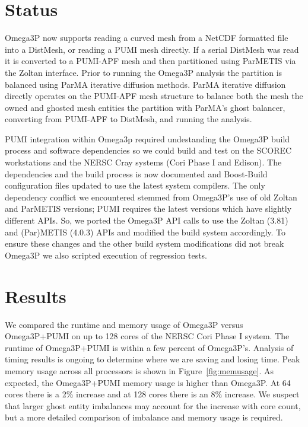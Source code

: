 \documentclass[a4paper]{article}
\begin{document}
\section{Status}
Omega3P now supports reading a curved mesh from a NetCDF formatted file into a
DistMesh, or reading a PUMI mesh directly.
If a serial DistMesh was read it is converted to a PUMI-APF mesh and then 
partitioned using ParMETIS via the Zoltan interface.
Prior to running the Omega3P analysis the partition is balanced using ParMA
iterative diffusion methods.
ParMA iterative diffusion directly operates on the PUMI-APF mesh structure to
balance both the mesh 
the owned and ghosted mesh entities 
the partition with ParMA's ghost balancer, converting from PUMI-APF to DistMesh,
and running the analysis.

PUMI integration within Omega3p required undestanding the Omega3P build process
and software dependencies so we could build and test on the SCOREC workstations
and the NERSC Cray systems (Cori Phase I and Edison).
The dependencies and the build process is now documented and Boost-Build
configuration files updated to use the latest system compilers.
The only dependency conflict we encountered stemmed from Omega3P's use of old
Zoltan and ParMETIS versions; PUMI requires the latest versions which have
slightly different APIs.
So, we ported the Omega3P API calls to use the Zoltan (3.81) and
(Par)METIS (4.0.3) APIs and modified the build system accordingly.
To ensure these changes and the other build system modifications did not break
Omega3P we also scripted execution of regression tests.

\section{Results}

We compared the runtime and memory usage of Omega3P versus Omega3P+PUMI on up to
128 cores of the NERSC Cori Phase I system.
The runtime of Omega3P+PUMI is within a few percent of Omega3P's.
Analysis of timing results is ongoing to determine where we are saving and
losing time.
Peak memory usage across all processors is shown in
Figure~\ref{fig:memusage}.
As expected, the Omega3P+PUMI memory usage is higher than Omega3P.
At 64 cores there is a 2\% increase and at 128 cores there is an 8\% increase.
We suspect that larger ghost entity imbalances may account for the increase with
core count, but a more detailed comparison of imbalance and memory usage is
required.
\end{document}
